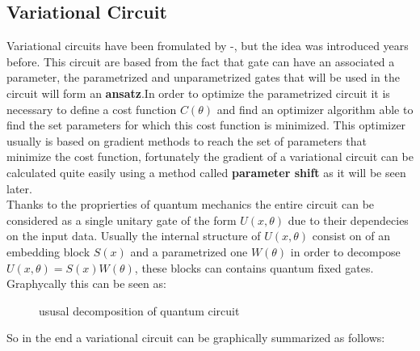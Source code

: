 \subsection{Variational Circuit}
Variational circuits have been fromulated by \cite{https://doi.org/10.48550/arxiv.1802.06002}-\cite{Benedetti_2019}, but the idea was introduced years before. This circuit are based from the fact that gate can have an associated a parameter, the parametrized and unparametrized gates that will be used in the circuit will form an \textbf{ansatz}.In order to optimize the parametrized circuit it is necessary to define a cost function $C(\theta)$ and find an optimizer algorithm able to find the set parameters for which this cost function is minimized. This optimizer usually is based on gradient methods to reach the set of parameters that minimize the cost function, fortunately the gradient of a variational circuit can be calculated quite easily using a method called \textbf{parameter shift} as it will be seen later.\\
Thanks to the proprierties of quantum mechanics the entire circuit can be considered as a single unitary gate of the form $U(x,\theta)$ due to their dependecies on the input data. Usually the internal structure of $U(x,\theta)$ consist on of an embedding block $S(x)$ and a parametrized one $W(\theta)$ in order to decompose $U(x,\theta) = S(x)W(\theta)$, these blocks can contains quantum fixed gates. Graphycally this can be seen as:\\
\begin{center}
	\begin{figure}[!h]
		\centering
	\caption{ususal decomposition of quantum circuit}
	\label{sw}
	\end{figure}
\end{center}
So in the end a variational circuit can be graphically summarized as follows:
